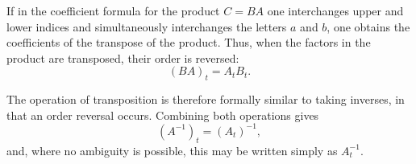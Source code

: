 \documentclass[11pt,a4paper]{book}
\begin{document}
If in the coefficient formula for the product $C=BA$ one interchanges upper and lower indices and simultaneously interchanges the letters $a$ and $b$, one obtains the coefficients of the transpose of the product.  Thus, when the factors in the product are transposed, their order is reversed:
\begin{equation}\label{eq:weber8-transpose-product}
(BA)_t=A_tB_t.
\end{equation}

The operation of transposition is therefore formally similar to taking inverses, in that an order reversal occurs.  Combining both operations gives
\begin{equation}\label{eq:weber8-inverse-transpose}
(A^{-1})_t=(A_t)^{-1},
\end{equation}
and, where no ambiguity is possible, this may be written simply as $A_t^{-1}$.
\end{document}
